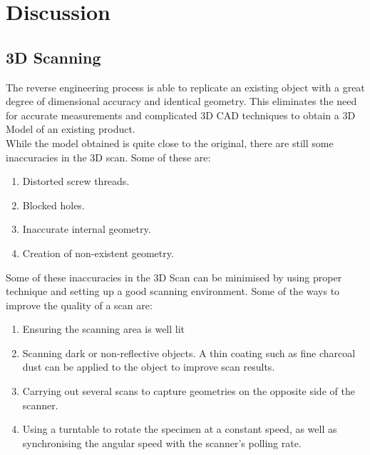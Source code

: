 \section{Discussion}
\subsection{3D Scanning}
The reverse engineering process is able to replicate an existing object with a great degree of dimensional accuracy and identical geometry. This eliminates the need for accurate measurements and complicated 3D CAD techniques to obtain a 3D Model of an existing product.\\
While the model obtained is quite close to the original, there are still some inaccuracies in the 3D scan. Some of these are:
\begin{enumerate}
	\item Distorted screw threads.
	\item Blocked holes.
	\item Inaccurate internal geometry.
	\item Creation of non-existent geometry.
\end{enumerate}
Some of these inaccuracies in the 3D Scan can be minimised by using proper technique and setting up a good scanning environment. Some of the ways to improve the quality of a scan are:
\begin{enumerate}
	\item Ensuring the scanning area is well lit
	\item Scanning dark or non-reflective objects. A thin coating such as fine charcoal dust can be applied to the object to improve scan results.
	\item Carrying out several scans to capture geometries on the opposite side of the scanner.
	\item Using a turntable to rotate the specimen at a constant speed, as well as synchronising the angular speed with the scanner's polling rate.
\end{enumerate}